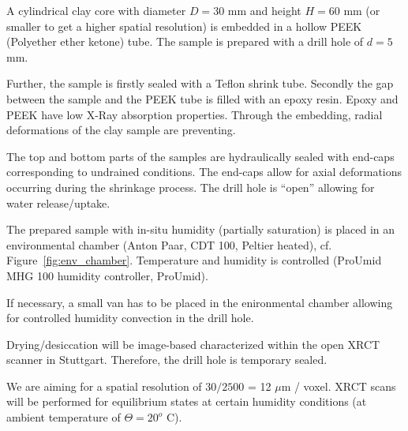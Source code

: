 \begin{list}{-}{\leftmargin=1em \itemindent=0em \itemsep=0em}
\item A cylindrical clay core with diameter $D=30$ mm and height 
$H=60$ mm (or smaller to get a higher spatial resolution) is embedded in a hollow PEEK (Polyether ether ketone) tube. 
The sample is prepared with a drill hole of $d=5$ mm.
\item Further, the sample is firstly sealed with a Teflon shrink tube. Secondly the gap between the sample and the PEEK tube is filled with an epoxy resin.
Epoxy and PEEK have low X-Ray absorption properties. Through the embedding, radial deformations of the clay sample are preventing. 
\item The top and bottom parts of the samples are hydraulically sealed with end-caps corresponding to undrained conditions. The end-caps allow for axial deformations occurring during the shrinkage process. The drill hole is ``open''  allowing for water release/uptake.
\item The prepared sample with in-situ humidity (partially saturation) is placed in an environmental chamber (Anton Paar, CDT 100, Peltier heated), cf. Figure~\ref{fig:env_chamber}. Temperature and humidity is controlled (ProUmid MHG 100 humidity controller, ProUmid). 
\item If necessary, a small van has to be placed in the enironmental chamber allowing for controlled humidity convection in the drill hole. 
\item Drying/desiccation will be image-based characterized within the open XRCT scanner in Stuttgart. Therefore, the drill hole is temporary sealed.
\item We are aiming for a spatial resolution of $30 / 2500$ = 12 $\mu$m / voxel. XRCT scans will be performed for equilibrium states at certain humidity conditions (at ambient temperature of $\Theta = 20^o$ C).
\end{list}
